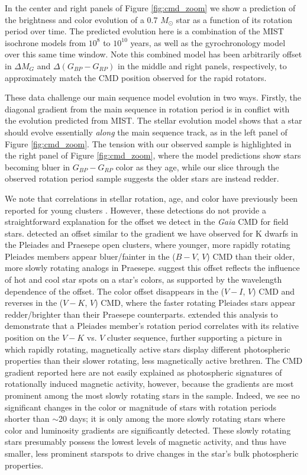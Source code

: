 \documentclass[preprint2]{aastex62}
\begin{document}
In the center and right panels of Figure \ref{fig:cmd_zoom} we show a prediction of the brightness and color evolution of a 0.7 $M_\odot$ star as a function of its rotation period over time. The predicted evolution here is a combination of the MIST isochrone models from $10^8$ to $10^{10}$ years, as well as the \citet{meibom2009} gyrochronology model over this same time window. Note this  combined model has been arbitrarily offset in $\Delta M_G$ and $\Delta(G_{BP} - G_{RP})$ in the middle and right panels, respectively, to approximately match the CMD position observed for the rapid rotators. 

These data challenge our main sequence model evolution in two ways. Firstly, the diagonal gradient from the main sequence in rotation period is in conflict with the evolution predicted from MIST. The stellar evolution model shows that a star should evolve essentially {\it along} the main sequence track, as in the left panel of Figure \ref{fig:cmd_zoom}. The tension with our observed sample is highlighted in the right panel of Figure \ref{fig:cmd_zoom}, where the model predictions show stars becoming bluer in $G_{BP}-G_{RP}$ color as they age, while our slice through the observed rotation period sample suggests the older stars are instead redder.

%
We note that correlations in stellar rotation, age, and color have previously been reported for young clusters \citep[e.g.][]{stauffer2003,covey2016}.
However, these detections do not provide a straightforward explanation for the offset we detect in the {\em Gaia} CMD for field stars.
\citet{stauffer2003} detected an offset similar to the gradient we have observed for K dwarfs in the Pleiades and Praesepe open clusters, where younger, more rapidly rotating Pleiades members appear bluer/fainter in the ($B-V$, $V$) CMD than their older, more slowly rotating analogs in Praesepe.  
\citet{stauffer2003} suggest this offset reflects the influence of hot and cool star spots on a star's colors, as supported by the wavelength dependence of the offset. The color offset disappears in the ($V-I$, $V$) CMD and reverses in the ($V-K$, $V$) CMD, where the faster rotating Pleiades stars appear redder/brighter than their Praesepe counterparts.  
\citet{covey2016} extended this analysis to demonstrate that a Pleiades member's rotation period correlates with its relative position on the $V-K$ vs. $V$ cluster sequence, further supporting a picture in which rapidly rotating, magnetically active stars display different photospheric properties than their slower rotating, less magnetically active brethren.  The CMD gradient reported here are not easily explained as photospheric signatures of rotationally induced magnetic activity, however, because the gradients are most prominent among the most slowly rotating stars in the sample.  Indeed, we see no significant changes in the color or magnitude of stars with rotation periods shorter than $\sim$20 days; it is only among the more slowly rotating stars where color and luminosity gradients are significantly detected.  These slowly rotating stars presumably possess the lowest levels of magnetic activity, and thus have smaller, less prominent starspots to drive changes in the star's bulk photospheric properties. 
\end{document}
